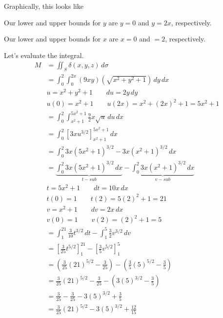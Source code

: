 \documentclass{article}
\newcommand{\lrp}[1]{\left( #1 \right)}
\newcommand{\lrb}[1]{\left[ #1 \right]}
\begin{document}
Graphically, this looks like
\begin{center}
\end{center}
Our lower and upper bounds for $y$ are $y=0$ and $y=2x$, respectively.

Our lower and upper bounds for $x$ are $x=0$ and $=2$, respectively.

Let's evaluate the integral.
\begin{align*}
    M&=\iint_S \delta(x,y,z)\,d\sigma\\
    &=\int_0^2\int_0^{2x}\lrp{9xy}\lrp{\sqrt{x^2+y^2+1}}\,dy\,dx\\
    &u=x^2+y^2+1\hspace{2em}du=2y\,dy\\
    &u(0)=x^2+1\hspace{2em}u(2x)=x^2+(2x)^2+1=5x^2+1\\
    &=\int_0^2 \int_{x^2+1}^{5x^2+1}\frac{9}{2}x\sqrt{u}\,du\,dx\\
    &=\int_0^2 \lrb{3xu^{3/2}}_{x^2+1}^{5x^2+1}\,dx\\
    &=\int_0^2 3x\lrp{5x^2+1}^{3/2}-3x\lrp{x^2+1}^{3/2}\,dx\\
    &=\underbrace{\int_0^2 3x(5x^2+1)^{3/2}\,dx}_{t-sub}-\underbrace{\int_0^2 3x(x^2+1)^{3/2}\,dx}_{v-sub}\\
    &t=5x^2+1\hspace{2em}dt=10x\,dx\\
    &t(0)=1\hspace{2em}t(2)=5(2)^2+1=21\\
    &v=x^2+1\hspace{2em}dv=2x\,dx\\
    &v(0)=1\hspace{2em}v(2)=(2)^2+1=5\\
    &=\int_1^{21}\frac{3}{10}t^{3/2}\,dt-\int_1^5 \frac{3}{2}v^{3/2}\,dv\\
    &=\lrb{\frac{3}{25}t^{5/2}}_1^{21}-\lrb{\frac{3}{5}v^{5/2}}_1^5\\
    &=\lrp{\frac{3}{25}(21)^{5/2}-\frac{3}{25}}-\lrp{\frac{3}{5}(5)^{5/2}-\frac{3}{5}}\\
    &=\frac{3}{25}(21)^{5/2}-\frac{3}{25}-\lrp{3(5)^{3/2}-\frac{3}{5}}\\
    &=\frac{3}{25}-\frac{3}{25}-3(5)^{3/2}+\frac{3}{5}\\
    &=\boxed{\frac{3}{25}(21)^{5/2}-3(5)^{3/2}+\frac{12}{15}}
\end{align*}
\end{document}
